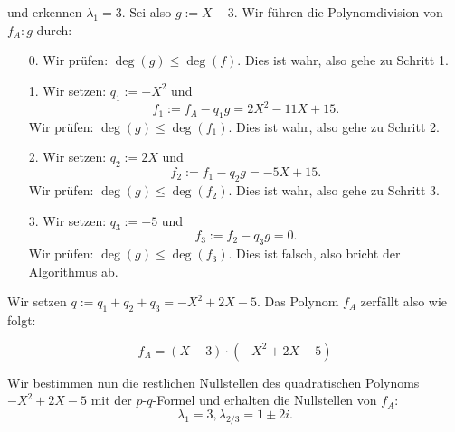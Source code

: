 \documentclass{article}
\begin{document}
und erkennen $\lambda_1 = 3$. Sei also $g := X - 3$.
Wir führen die Polynomdivision von $f_A:g$ durch:

\begin{enumerate}
    \item[0.] Wir prüfen: $\deg(g) \leq \deg(f)$. Dies ist wahr, also gehe zu Schritt 1.
    
    \item[1.] Wir setzen: $q_1 := -X^2$ und 
    \[
    f_1 := f_A - q_1 g  = 2X^2 - 11X + 15.
    \]
    Wir prüfen: $\deg(g) \leq \deg(f_1)$. Dies ist wahr, also gehe zu Schritt 2.
    
    \item[2.] Wir setzen: $q_2 := 2X$ und 
    \[
    f_2 := f_1 - q_2 g = -5X + 15.
    \]
    Wir prüfen: $\deg(g) \leq \deg(f_2)$. Dies ist wahr, also gehe zu Schritt 3.
    
    \item[3.] Wir setzen: $q_3 := -5$ und 
    \[
    f_3 := f_2 - q_3 g =  0.
    \]
    Wir prüfen: $\deg(g) \leq \deg(f_3)$. Dies ist falsch, also bricht der Algorithmus ab.
\end{enumerate}

Wir setzen $q := q_1 + q_2 + q_3 = -X^2 + 2X - 5$.
Das Polynom $f_A$ zerfällt also wie folgt:

\[
f_A = (X - 3)\cdot(-X^2 + 2X - 5)
\]

Wir bestimmen nun die restlichen Nullstellen
des quadratischen Polynoms $-X^2 + 2X - 5$
mit der $p$-$q$-Formel und erhalten die Nullstellen
von $f_A$:
\[
\lambda_1 = 3, \lambda_{2/3} = 1 \pm 2i.
\]
\end{document}
